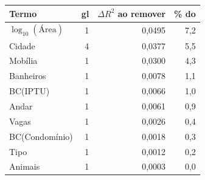 \begin{tabular}{lrrr}
\toprule
Termo & gl & $\Delta R^2$ ao remover & \% do \Rtwo{} \\
\midrule
$\log_{10}(\text{Área})$ & 1 & 0,0495 & 7,2 \\
Cidade & 4 & 0,0377 & 5,5 \\
Mobília & 1 & 0,0300 & 4,3 \\
Banheiros & 1 & 0,0078 & 1,1 \\
BC(IPTU) & 1 & 0,0066 & 1,0 \\
Andar & 1 & 0,0061 & 0,9 \\
Vagas & 1 & 0,0026 & 0,4 \\
BC(Condomínio) & 1 & 0,0018 & 0,3 \\
Tipo & 1 & 0,0012 & 0,2 \\
Animais & 1 & 0,0003 & 0,0 \\
\bottomrule
\end{tabular}
